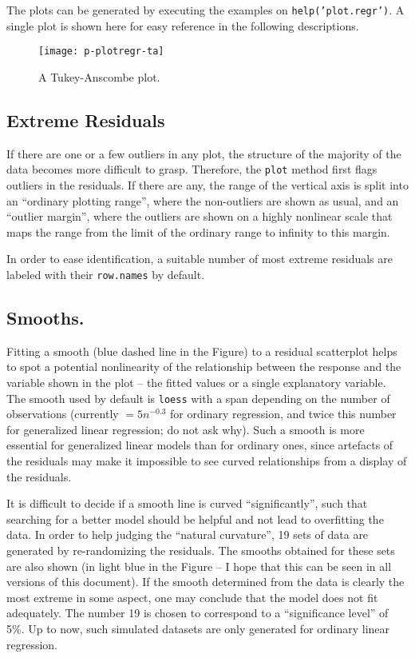 \documentclass{article}
\providecommand{\T}{\texttt}
\begin{document}
The plots can be generated by executing the examples on
\T{help('plot.regr')}. 
A single plot is shown here for easy reference in the following
descriptions. 

\begin{figure}[htb]
\centerline{\texttt{[image: p-plotregr-ta]}}
\caption{A Tukey-Anscombe plot.}
\end{figure}

\subsection{Extreme Residuals}
If there are one or a few outliers in any plot, the structure of the
majority of the data becomes more difficult to grasp. 
Therefore, the \T{plot} method first flags outliers in the residuals.
If there are any, the range of the vertical axis is split into an
``ordinary plotting range'', where the non-outliers are shown as usual, and
an ``outlier margin'', where the outliers are shown on a highly nonlinear
scale that maps the range from the limit of the ordinary range to infinity 
to this margin.

In order to ease identification, a suitable number of most extreme
residuals are labeled with their \T{row.names} by default.

\subsection{Smooths.}
Fitting a smooth (blue dashed line in the Figure) 
to a residual scatterplot helps to spot a potential
nonlinearity of the relationship between the response and the variable
shown in the plot -- the fitted values or a single explanatory variable.
The smooth used by default is \T{loess} with a span depending on the number
of observations (currently $= 5n^{-0.3}$ for ordinary regression, and twice 
this number for generalized linear regression; do not ask why).
Such a smooth is more essential for generalized linear models than for 
ordinary ones, since artefacts of the residuals may make it impossible to 
see curved relationships from a display of the residuals.

It is difficult to decide if a smooth line is curved ``significantly'',
such that searching for a better model should be helpful and not lead to 
overfitting the data.
In order to help judging the ``natural curvature'', 19 sets of data are
generated by 
re-randomizing the residuals. 
The smooths obtained for these sets are also shown (in light blue in the
Figure -- I hope that this can be seen in all versions of this document).
If the smooth determined from the data is clearly the most extreme in some
aspect, one may conclude that the model does not fit adequately.
The number 19 is chosen to correspond to a ``significance level'' of 5\%.
Up to now, such simulated datasets are only generated for ordinary linear
regression. 
\end{document}
